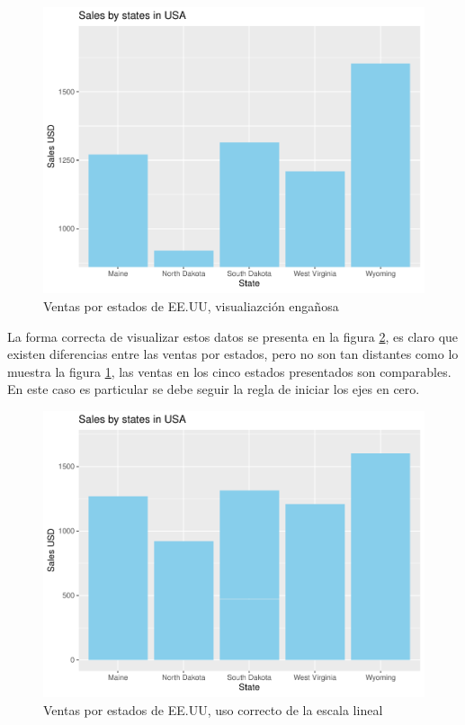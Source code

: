 \documentclass[
]{book}
\begin{document}
\begin{figure}

{\centering \includegraphics[width=0.8\linewidth]{Lineamientos-Visualizar_files/figure-latex/usoincorrectoejey-fig-1} 

}

\caption{Ventas por estados de EE.UU, visualiazción engañosa}\label{fig:usoincorrectoejey-fig}
\end{figure}

La forma correcta de visualizar estos datos se presenta en la figura \ref{fig:usocorrectoejeyinicio0-fig}, es claro que existen diferencias entre las ventas por estados, pero no son tan distantes como lo muestra la figura \ref{fig:usoincorrectoejey-fig}, las ventas en los cinco estados presentados son comparables. En este caso es particular se debe seguir la regla de iniciar los ejes en cero.

\begin{figure}

{\centering \includegraphics[width=0.8\linewidth]{Lineamientos-Visualizar_files/figure-latex/usocorrectoejeyinicio0-fig-1} 

}

\caption{Ventas por estados de EE.UU, uso correcto de la escala lineal}\label{fig:usocorrectoejeyinicio0-fig}
\end{figure}
\end{document}
